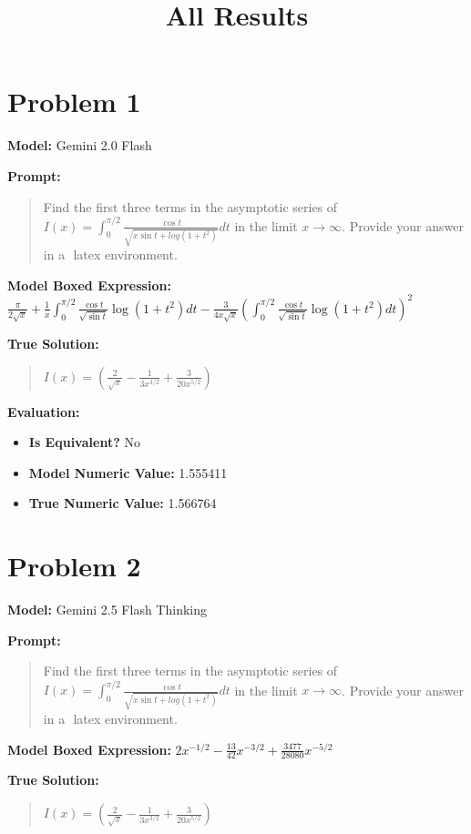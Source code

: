 \documentclass{article}
\title{All Results}
\begin{document}
\maketitle
\section*{Problem 1}
\textbf{Model:} Gemini 2.0 Flash

\textbf{Prompt:}
\begin{quote}
Find the first three terms in the asymptotic series of $I(x)=\int_0^{\pi/2} \frac{\cos{t}}{\sqrt{x\sin{t}+log(1+t^2)}}dt$ in the limit $x \to \infty$. Provide your answer in a $\boxed{}$ latex environment.
\end{quote}
\textbf{Model Boxed Expression:} $\frac{\pi}{2\sqrt{x}} + \frac{1}{x} \int_0^{\pi/2} \frac{\cos t}{\sqrt{\sin t}} \log(1+t^2) dt - \frac{3}{4x\sqrt{x}} \left(\int_0^{\pi/2} \frac{\cos t}{\sqrt{\sin t}} \log(1+t^2) dt\right)^2$

\textbf{True Solution:}
\begin{quote}
$I(x)=(\frac{2}{\sqrt{x}}-\frac{1}{3x^{3/2}}+\frac{3}{20x^{5/2}} )$
\end{quote}

\textbf{Evaluation:}
\begin{itemize}
\item \textbf{Is Equivalent?} No
\item \textbf{Model Numeric Value:} 1.555411
\item \textbf{True Numeric Value:} 1.566764
\end{itemize}
\vspace{1cm}
\section*{Problem 2}
\textbf{Model:} Gemini 2.5 Flash Thinking

\textbf{Prompt:}
\begin{quote}
Find the first three terms in the asymptotic series of $I(x)=\int_0^{\pi/2} \frac{\cos{t}}{\sqrt{x\sin{t}+log(1+t^2)}}dt$ in the limit $x \to \infty$. Provide your answer in a $\boxed{}$ latex environment.
\end{quote}
\textbf{Model Boxed Expression:} $2x^{-1/2} - \frac{13}{42}x^{-3/2} + \frac{3477}{28080}x^{-5/2}$

\textbf{True Solution:}
\begin{quote}
$I(x)=(\frac{2}{\sqrt{x}}-\frac{1}{3x^{3/2}}+\frac{3}{20x^{5/2}} )$
\end{quote}
\end{document}

